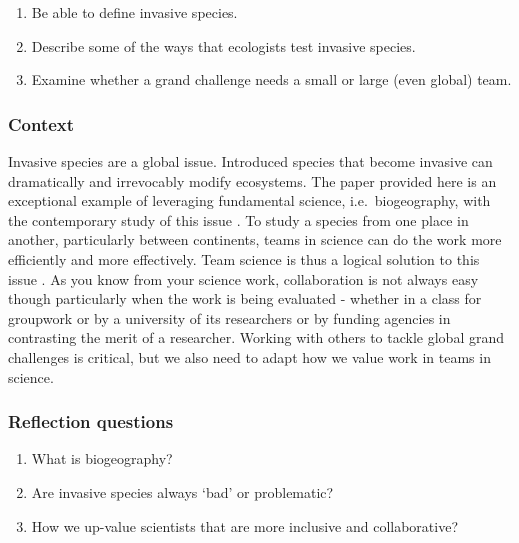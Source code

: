 \documentclass[
]{book}
\providecommand{\tightlist}{%
  \setlength{\itemsep}{0pt}\setlength{\parskip}{0pt}}
\begin{document}
\begin{enumerate}
\def\labelenumi{\arabic{enumi}.}
\tightlist
\item
  Be able to define invasive species.
\item
  Describe some of the ways that ecologists test invasive species.\\
\item
  Examine whether a grand challenge needs a small or large (even global) team.
\end{enumerate}

\hypertarget{context-2}{%
\subsubsection*{Context}\label{context-2}}

Invasive species are a global issue. Introduced species that become invasive can dramatically and irrevocably modify ecosystems. The paper provided here is an exceptional example of leveraging fundamental science, i.e.~biogeography, with the contemporary study of this issue \citep{RN5996}. To study a species from one place in another, particularly between continents, teams in science can do the work more efficiently and more effectively. Team science is thus a logical solution to this issue \citep{RN6000}. As you know from your science work, collaboration is not always easy though particularly when the work is being evaluated - whether in a class for groupwork or by a university of its researchers or by funding agencies in contrasting the merit of a researcher. Working with others to tackle global grand challenges is critical, but we also need to adapt how we value work in teams in science.

\hypertarget{reflection-questions-2}{%
\subsubsection*{Reflection questions}\label{reflection-questions-2}}

\begin{enumerate}
\def\labelenumi{\arabic{enumi}.}
\tightlist
\item
  What is biogeography?\\
\item
  Are invasive species always `bad' or problematic?\\
\item
  How we up-value scientists that are more inclusive and collaborative?
\end{enumerate}
\end{document}
